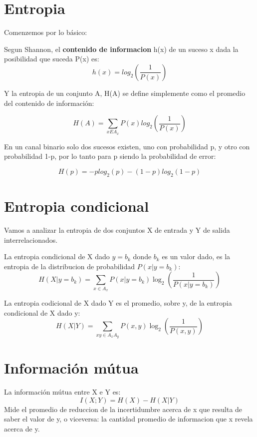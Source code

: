 \documentclass[a4paper,12pt]{article}
\begin{document}


\section{Entropia}

Comenzemos por lo básico:

Segun Shannon, el \textbf{contenido de informacion} h(x) de un suceso x dada la posibilidad que suceda P(x) es:
$$ h(x) = log_{2}\left(\frac{1}{P(x)}\right) $$

Y la entropia de un conjunto A, H(A) se define simplemente como el promedio del contenido de información:

$$ H(A) = \sum_{x E A_{x}} P(x)log_{2}\left(\frac{1}{P(x)}\right)$$

En un canal binario solo dos sucesos existen, uno con probabilidad p, y otro con probabilidad 1-p, por lo tanto para p siendo la probabilidad de error:

$$ H(p) = -p log_{2}(p)-(1-p)log_{2}(1-p) $$

\section{Entropia condicional}

Vamos a analizar la entropia de dos conjuntos X de entrada y Y de salida interrelacionados.

La entropia condicional de X dado $y=b_k$ donde $b_k$ es un valor dado, es la entropia de la distribucion de probabilidad $P(x|y=b_{k})$:
$$H(X|y=b_{k}) = \sum_{x \in A_{x}} P(x | y=b_{k})\log_2\left(\frac{1}{P(x | y=b_{k})}\right) $$

La entropia codicional de X dado Y es el promedio, sobre y, de la entropia condicional de X dado y:
$$H(X|Y) =  \sum_{xy \in A_{x}A_{y}} P(x,y)\log_2\left(\frac{1}{P(x,y)}\right) $$

\section{Información mútua}
La información mútua entre X e Y es:
$$I(X;Y) = H(X)-H(X|Y)$$
Mide el promedio de reduccion de la incertidumbre acerca de x que resulta de saber el valor de y, o viceversa: la cantidad promedio de informacion que x revela acerca de y.
\end{document}
